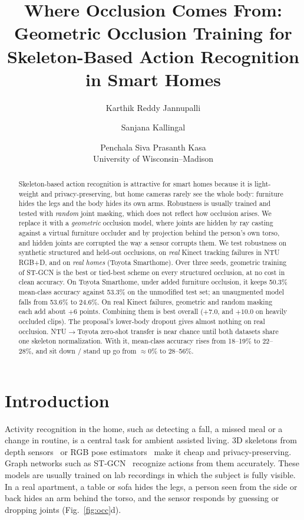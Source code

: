 \documentclass[11pt,twocolumn,letterpaper]{article}
\title{Where Occlusion Comes From: Geometric Occlusion Training for\\Skeleton-Based Action Recognition in Smart Homes}
\author{Karthik Reddy Jannupalli \and Sanjana Kallingal \and Penchala Siva Prasanth Kasa\\
University of Wisconsin--Madison}
\begin{document}
\maketitle

\begin{abstract}
Skeleton-based action recognition is attractive for smart homes because it is light-weight and privacy-preserving,
but home cameras rarely see the whole body: furniture hides the legs and the body hides its own arms.
Robustness is usually trained and tested with \emph{random} joint masking, which does not reflect how occlusion arises.
We replace it with a \emph{geometric} occlusion model, where joints are hidden by ray casting against a virtual
furniture occluder and by projection behind the person's own torso, and hidden joints are corrupted the way a sensor
corrupts them. We test robustness on synthetic structured and held-out occlusions, on \emph{real} Kinect tracking failures in NTU RGB+D,
and on \emph{real homes} (Toyota Smarthome).
Over three seeds, geometric training of ST-GCN is the best or tied-best scheme on every structured occlusion, at no cost in clean accuracy.
On Toyota Smarthome, under added furniture occlusion, it keeps 50.3\% mean-class accuracy against 53.3\% on the unmodified test set; an unaugmented model falls from 53.6\% to 24.6\%.
On real Kinect failures, geometric and random masking each add about $+6$ points.
Combining them is best overall ($+7.0$, and $+10.0$ on heavily occluded clips).
The proposal's lower-body dropout gives almost nothing on real occlusion.
NTU$\rightarrow$Toyota zero-shot transfer is near chance until both datasets share one skeleton normalization.
With it, mean-class accuracy rises from 18--19\% to 22--28\%, and sit down / stand up go from ${\approx}0\%$ to 28--56\%.
\end{abstract}

\section{Introduction}
Activity recognition in the home, such as detecting a fall, a missed meal or a change in routine, is a central task for ambient assisted living.
3D skeletons from depth sensors~\cite{shotton2011kinect} or RGB pose estimators~\cite{rogez2019lcrnet} make it cheap and privacy-preserving.
Graph networks such as ST-GCN~\cite{yan2018stgcn} recognize actions from them accurately.
These models are usually trained on lab recordings in which the subject is fully visible.
In a real apartment, a table or sofa hides the legs, a person seen from the side or back hides an arm behind the torso, and the sensor responds by guessing or dropping joints (Fig.~\ref{fig:occ}d).
\end{document}
